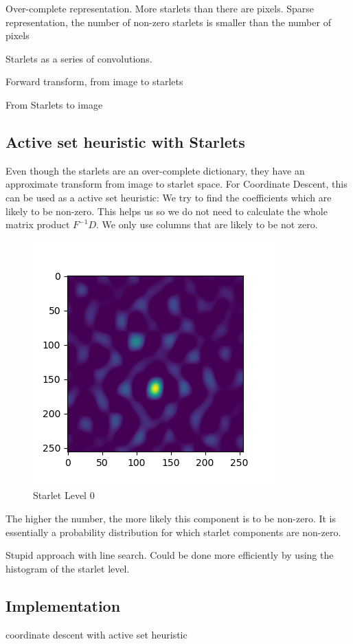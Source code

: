 Over-complete representation. More starlets than there are pixels. Sparse representation, the number of non-zero starlets is smaller than the number of pixels

Starlets as a series of convolutions.

Forward transform, from image to starlets

From Starlets to image

\subsection{Active set heuristic with Starlets}\label{cd:heuristic}
Even though the starlets are an over-complete dictionary, they have an approximate transform from image to starlet space. For Coordinate Descent, this can be used as a active set heuristic: We try to find the coefficients which are likely to be non-zero. This helps us so we do not need to calculate the whole matrix product $F^{-1}D$. We only use columns that are likely to be not zero.

\begin{figure}[h]
	\centering
	\includegraphics[width=0.5\linewidth]{./chapters/05.algorithms/sim02/starlets0.png}
	\caption{Starlet Level 0}
	\label{alg:heuristic:starlet}
\end{figure}

The higher the number, the more likely this component is to be non-zero. It is essentially a probability distribution for which starlet components are non-zero.

Stupid approach with line search. Could be done more efficiently by using the histogram of the starlet level.

\subsection{Implementation}
coordinate descent with active set heuristic


